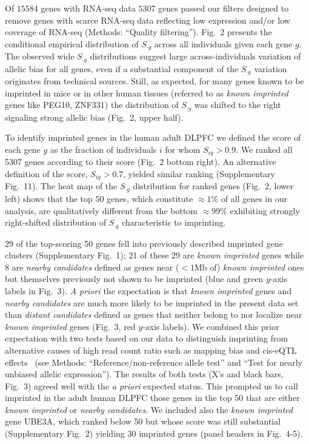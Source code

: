 \documentclass[letterpaper]{article}
\begin{document}
Of \(15584\) genes with RNA-seq data \(5307\) genes passed our filters designed to remove genes with
scarce RNA-seq data reflecting low expression and/or low coverage of
RNA-seq (Methods: ``Quality filtering'').
Fig.~2 presents the conditional empirical distribution
of \(S_{\cdot g}\) across all individuals given each gene \(g\).  The observed wide
\(S_{\cdot g}\) distributions suggest large across-individuals variation of allelic bias for all
genes, even if a substantial component of the \(S_{\cdot g}\) variation originates from technical sources.
Still, as expected, for many genes known to be imprinted in mice or in other human tissues
(referred to as \emph{known imprinted} genes like PEG10, ZNF331) the distribution of \(S_{\cdot g}\) was shifted
to the right signaling strong allelic bias (Fig.~2, upper
half).

To identify imprinted genes in the human adult DLPFC we defined the score of
each gene \(g\) as the fraction of individuals \(i\) for whom \(S_{ig}>0.9\).
We ranked all 5307 genes according to their score
(Fig.~2 bottom right).  An alternative definition of the
score, \(S_{ig}>0.7\), yielded similar ranking (Supplementary Fig.~11). The
heat map of the \(S_{\cdot g}\) distribution for ranked genes
(Fig.~2, lower left) shows that the top \(50\) genes,
which constitute \(\approx 1\%\) of all genes in our analysis, are
qualitatively different from the bottom \(\approx 99\%\) exhibiting strongly
right-shifted distribution of \(S_{\cdot g}\) characteristic to imprinting.

29 of the top-scoring 50 genes fell into previously described imprinted gene
clusters (Supplementary Fig.~1); 21 of these 29 are \emph{known imprinted}
genes while 8 are \emph{nearby candidates} defined as genes near
(\(<1\mathrm{Mb}\) of) \emph{known imprinted} ones but themselves previously
not shown to be imprinted (blue and green \(y\)-axis labels in
Fig.~3).   \emph{A priori} the expectation is that
\emph{known imprinted} genes and \emph{nearby candidates} are much more likely
to be imprinted  in the present data set than \emph{distant candidates}
defined as genes that neither belong to nor localize near \emph{known
imprinted} genes (Fig.~3, red \(y\)-axis labels).  We
combined this prior expectation with two tests based on our data to
distinguish imprinting from alternative causes of high read count ratio such
as mapping bias and cis-eQTL effects~\cite{Babak2015} (see Methods:
``Reference/non-reference allele test'' and ``Test for nearly unbiased allelic
expression'').  The results of both tests (X's and black bars,
Fig.~3) agreed well with the \emph{a priori} expected
status.  This prompted us to call imprinted in the adult human DLPFC those
genes in the top 50 that are either
\emph{known imprinted} or \emph{nearby candidates}.
We included also the \emph{known imprinted} gene UBE3A, which ranked below 50
but whose score was still substantial (Supplementary Fig.~2) yielding 30
imprinted genes (panel headers in Fig.~4-5).
\end{document}
